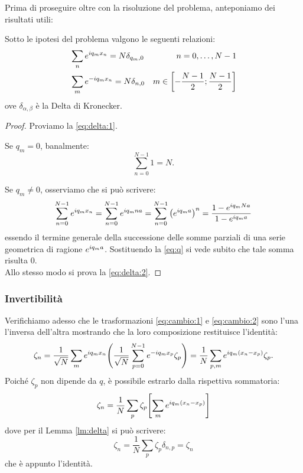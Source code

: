         \par Prima di proseguire oltre con la risoluzione del problema, anteponiamo dei risultati utili:
        \begin{lemma} \label{lm:delta}
            Sotto le ipotesi del problema valgono le seguenti relazioni:
            \begin{align}
                &\sum_{n}e^{iq_mx_n}=N\delta_{q_m,0} &n=0,\dots,N-1 \label{eq:delta:1}\\
                &\sum_{m}e^{-iq_mx_n}=N\delta_{n,0} &m\in\left[-\frac{N-1}{2};\frac{N-1}{2}\right] \label{eq:delta:2}
            \end{align}
        ove $\delta_{\alpha,\beta}$ \`e la Delta di Kronecker.
        \end{lemma}
        \begin{proof}
            Proviamo la \eqref{eq:delta:1}.
            \par Se $q_m=0$, banalmente:
                $$\sum_{n=0}^{N-1}1=N.$$
            \par Se $q_m\neq0$, osserviamo che si pu\`o scrivere:
                $$\sum_{n=0}^{N-1} e^{iq_mx_n}=\sum_{n=0}^{N-1} e^{iq_mna}=\sum_{n=0}^{N-1}\qty(e^{iq_ma})^n=\frac{1-e^{iq_mNa}}{1-e^{iq_ma}}$$
            essendo il termine generale della successione delle somme parziali di una serie geometrica di ragione $e^{iq_ma}$. Sostituendo la \eqref{eq:q} si vede subito che tale somma risulta $0$. \\ Allo stesso modo si prova la \eqref{eq:delta:2}.
        \end{proof}
        \subsubsection{Invertibilit\`a}
            Verifichiamo adesso che le trasformazioni \eqref{eq:cambio:1} e \eqref{eq:cambio:2} sono l'una l'inversa dell'altra mostrando che la loro composizione restituisce l'identit\`a:
                $$\zeta_n=\frac{1}{\sqrt{N}}\sum_{m}e^{iq_mx_n}\qty(\frac{1}{\sqrt{N}}\sum_{p=0}^{N-1}e^{-iq_mx_p}\zeta_p)=\frac{1}{N}\sum_{p,m}e^{iq_m\qty(x_n-x_p)}\zeta_p.$$
            Poich\'e $\zeta_p$ non dipende da $q$, \`e possibile estrarlo dalla rispettiva sommatoria:
                $$\zeta_n=\frac{1}{N}\sum_p\zeta_p\qty[\sum_m e^{iq_m\qty(x_n-x_p)}]$$
            dove per il Lemma \ref{lm:delta} si pu\`o scrivere:
                $$\zeta_n=\frac{1}{N}\sum_p\zeta_p\delta_{n,p}=\zeta_n$$
            che \`e appunto l'identit\`a.
